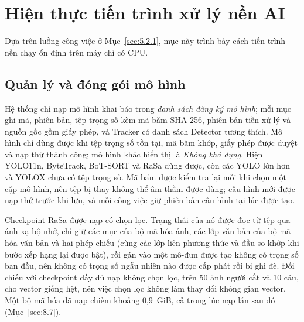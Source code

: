 \section{Hiện thực tiến trình xử lý nền AI}
\label{sec:6.2}

Dựa trên luồng công việc ở Mục~\ref{sec:5.2.1}, mục này trình bày cách tiến trình nền chạy ổn định trên máy chỉ có CPU.

\subsection{Quản lý và đóng gói mô hình}
\label{sec:6.2.1}

Hệ thống chỉ nạp mô hình khai báo trong \emph{danh sách đăng ký mô hình}; mỗi mục ghi mã, phiên bản, tệp trọng số kèm mã băm SHA-256, phiên bản tiền xử lý và nguồn gốc gồm giấy phép, và Tracker có danh sách Detector tương thích. Mô hình chỉ dùng được khi tệp trọng số tồn tại, mã băm khớp, giấy phép được duyệt và nạp thử thành công; mô hình khác hiển thị là \emph{Không khả dụng}. Hiện YOLO11n, ByteTrack, BoT-SORT và RaSa dùng được, còn các YOLO lớn hơn và YOLOX chưa có tệp trọng số. Mã băm được kiểm tra lại mỗi khi chọn một cặp mô hình, nên tệp bị thay không thể âm thầm được dùng; cấu hình mới được nạp thử trước khi lưu, và mỗi công việc giữ phiên bản cấu hình tại lúc được tạo.

Checkpoint RaSa được nạp có chọn lọc. Trạng thái của nó được đọc từ tệp qua ánh xạ bộ nhớ, chỉ giữ các mục của bộ mã hóa ảnh, các lớp văn bản của bộ mã hóa văn bản và hai phép chiếu (cùng các lớp liên phương thức và đầu so khớp khi bước xếp hạng lại được bật), rồi gán vào một mô-đun được tạo không có trọng số ban đầu, nên không có trọng số ngẫu nhiên nào được cấp phát rồi bị ghi đè. Đối chiếu với checkpoint đầy đủ nạp không chọn lọc, trên 50 ảnh người cắt và 10 câu, cho vector giống hệt, nên việc chọn lọc không làm thay đổi không gian vector. Một bộ mã hóa đã nạp chiếm khoảng 0,9~GiB, cả trong lúc nạp lẫn sau đó (Mục~\ref{sec:8.7}).

